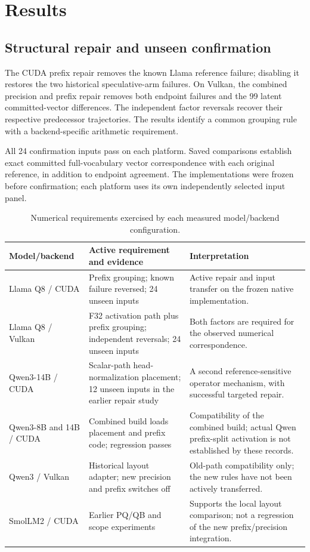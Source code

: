 \section{Results}
\label{sec:results}
\subsection{Structural repair and unseen confirmation}
The CUDA prefix repair removes the known Llama reference failure; disabling it restores the two historical speculative-arm failures. On Vulkan, the combined precision and prefix repair removes both endpoint failures and the 99 latent committed-vector differences. The independent factor reversals recover their respective predecessor trajectories. The results identify a common grouping rule with a backend-specific arithmetic requirement.

All 24 confirmation inputs pass on each platform. Saved comparisons establish exact committed full-vocabulary vector correspondence with each original reference, in addition to endpoint agreement. The implementations were frozen before confirmation; each platform uses its own independently selected input panel.

\begin{table}[t]
\centering\small
\caption{Numerical requirements exercised by each measured model/backend configuration.}
\label{tab:coverage}
\begin{tabularx}{\textwidth}{@{}>{\raggedright\arraybackslash}p{2.8cm}>{\raggedright\arraybackslash}p{3.7cm}Y@{}}\toprule
Model/backend & Active requirement and evidence & Interpretation\\\midrule
Llama Q8 / CUDA & Prefix grouping; known failure reversed; 24 unseen inputs & Active repair and input transfer on the frozen native implementation.\\
Llama Q8 / Vulkan & F32 activation path plus prefix grouping; independent reversals; 24 unseen inputs & Both factors are required for the observed numerical correspondence.\\
Qwen3-14B / CUDA & Scalar-path head-normalization placement; 12 unseen inputs in the earlier repair study & A second reference-sensitive operator mechanism, with successful targeted repair.\\
Qwen3-8B and 14B / CUDA & Combined build loads placement and prefix code; regression passes & Compatibility of the combined build; actual Qwen prefix-split activation is not established by these records.\\
Qwen3 / Vulkan & Historical layout adapter; new precision and prefix switches off & Old-path compatibility only; the new rules have not been actively transferred.\\
SmolLM2 / CUDA & Earlier PQ/QB and scope experiments & Supports the local layout comparison; not a regression of the new prefix/precision integration.\\\bottomrule
\end{tabularx}
\end{table}

